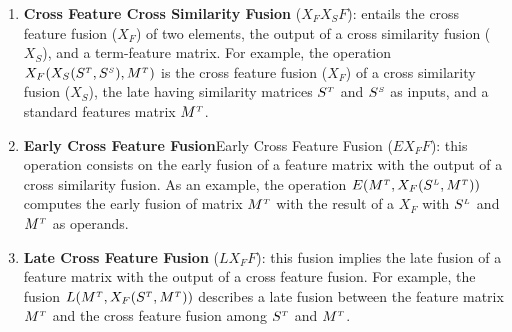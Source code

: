 \begin{enumerate}
\begin{enumerate}
\item \textbf{Cross Feature Cross Similarity Fusion} ($X_FX_SF$): entails the cross feature fusion ($X_F$) of two elements, the output of a cross similarity fusion ($X_S$), and a term-feature matrix. For example, the operation $X_F(X_S(S^{\scriptscriptstyle T}, S^{\scriptscriptstyle S}), M^{\scriptscriptstyle T})$ is the cross feature fusion ($X_F$) of a cross similarity fusion ($X_S$), the late having similarity matrices $S^{\scriptscriptstyle T}$ and $S^{\scriptscriptstyle S}$ as inputs, and a standard features matrix $M^{\scriptscriptstyle T}$.

%
\item \textbf{Early Cross Feature Fusion}{Early Cross Feature Fusion} ($EX_FF$):  this operation consists on the early fusion of a feature matrix with the output of a cross similarity fusion. As an example, the operation $E(M^{\scriptscriptstyle T},X_F(S^{\scriptscriptstyle L}, M^{\scriptscriptstyle T}))$ computes the early fusion of matrix $M^{\scriptscriptstyle T}$ with the result of a $X_F$ with $S^{\scriptscriptstyle L}$ and $M^{\scriptscriptstyle T}$ as operands. 
%

\item \textbf{Late Cross Feature Fusion} ($LX_FF$): this fusion implies the late fusion of a feature matrix with the output of a cross feature fusion. For example, the fusion $L(M^{\scriptscriptstyle T}, X_F(S^{\scriptscriptstyle T}, M^{\scriptscriptstyle T}))$ describes a late fusion between the feature matrix $M^{\scriptscriptstyle T}$ and the cross feature fusion among $S^{\scriptscriptstyle T}$ and $M^{\scriptscriptstyle T}$.
\end{enumerate}


\end{enumerate}
